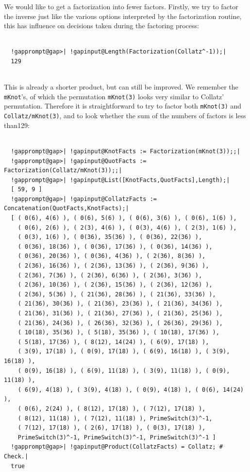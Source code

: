 \documentclass[a4paper,11pt]{report}
\begin{document}
{{ We would like to get a factorization into fewer factors. Firstly, we try to
factor the inverse \texttt{}\texttt{} just like the
various options interpreted by the factorization routine, this has influence
on decisions taken during the factoring process: 
\begin{Verbatim}[commandchars=!@|,fontsize=\small,frame=single,label=Example]
  
  !gapprompt@gap>| !gapinput@Length(Factorization(Collatz^-1));|
  129
  
\end{Verbatim}
 This is already a shorter product, but can still be improved. We remember the \texttt{mKnot}'s, of which the permutation \texttt{mKnot(3)} looks very similar to Collatz' permutation. Therefore it is straightforward to
try to factor both \texttt{mKnot(3)} and \texttt{Collatz/mKnot(3)}, and to look whether the sum of the numbers of factors is less
than{\nobreakspace}129: 
\begin{Verbatim}[commandchars=!@|,fontsize=\small,frame=single,label=Example]
  
  !gapprompt@gap>| !gapinput@KnotFacts := Factorization(mKnot(3));;|
  !gapprompt@gap>| !gapinput@QuotFacts := Factorization(Collatz/mKnot(3));;|
  !gapprompt@gap>| !gapinput@List([KnotFacts,QuotFacts],Length);|
  [ 59, 9 ]
  !gapprompt@gap>| !gapinput@CollatzFacts := Concatenation(QuotFacts,KnotFacts);|
  [ ( 0(6), 4(6) ), ( 0(6), 5(6) ), ( 0(6), 3(6) ), ( 0(6), 1(6) ), 
    ( 0(6), 2(6) ), ( 2(3), 4(6) ), ( 0(3), 4(6) ), ( 2(3), 1(6) ), 
    ( 0(3), 1(6) ), ( 0(36), 35(36) ), ( 0(36), 22(36) ), 
    ( 0(36), 18(36) ), ( 0(36), 17(36) ), ( 0(36), 14(36) ), 
    ( 0(36), 20(36) ), ( 0(36), 4(36) ), ( 2(36), 8(36) ), 
    ( 2(36), 16(36) ), ( 2(36), 13(36) ), ( 2(36), 9(36) ), 
    ( 2(36), 7(36) ), ( 2(36), 6(36) ), ( 2(36), 3(36) ), 
    ( 2(36), 10(36) ), ( 2(36), 15(36) ), ( 2(36), 12(36) ), 
    ( 2(36), 5(36) ), ( 21(36), 28(36) ), ( 21(36), 33(36) ), 
    ( 21(36), 30(36) ), ( 21(36), 23(36) ), ( 21(36), 34(36) ), 
    ( 21(36), 31(36) ), ( 21(36), 27(36) ), ( 21(36), 25(36) ), 
    ( 21(36), 24(36) ), ( 26(36), 32(36) ), ( 26(36), 29(36) ), 
    ( 10(18), 35(36) ), ( 5(18), 35(36) ), ( 10(18), 17(36) ), 
    ( 5(18), 17(36) ), ( 8(12), 14(24) ), ( 6(9), 17(18) ), 
    ( 3(9), 17(18) ), ( 0(9), 17(18) ), ( 6(9), 16(18) ), ( 3(9), 16(18) ),
    ( 0(9), 16(18) ), ( 6(9), 11(18) ), ( 3(9), 11(18) ), ( 0(9), 11(18) ),
    ( 6(9), 4(18) ), ( 3(9), 4(18) ), ( 0(9), 4(18) ), ( 0(6), 14(24) ), 
    ( 0(6), 2(24) ), ( 8(12), 17(18) ), ( 7(12), 17(18) ), 
    ( 8(12), 11(18) ), ( 7(12), 11(18) ), PrimeSwitch(3)^-1, 
    ( 7(12), 17(18) ), ( 2(6), 17(18) ), ( 0(3), 17(18) ), 
    PrimeSwitch(3)^-1, PrimeSwitch(3)^-1, PrimeSwitch(3)^-1 ]
  !gapprompt@gap>| !gapinput@Product(CollatzFacts) = Collatz; # Check.|
  true
  

\end{Verbatim}}}
\end{document}
